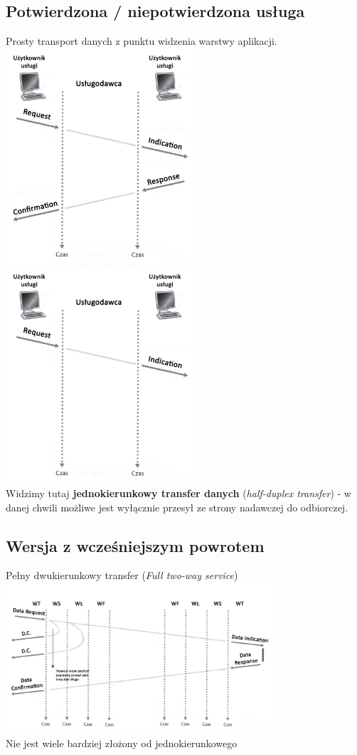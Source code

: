 \documentclass[a4paper,twoside]{article}
\begin{document}
\subsection{Potwierdzona / niepotwierdzona usługa}
Prosty transport danych z punktu widzenia warstwy aplikacji.\\
\includegraphics[width=7cm]{./images/image03_confirmation.jpg}
\includegraphics[width=7cm]{./images/image03_no_confirmation.jpg}\\
Widzimy tutaj \textbf{jednokierunkowy transfer danych} (\emph{half-duplex transfer}) - w danej chwili możliwe jest wyłącznie przesył ze strony nadawczej do odbiorczej.
\subsection{Wersja z wcześniejszym powrotem}
Pełny dwukierunkowy transfer (\emph{Full two-way service})\\
\includegraphics[width=10cm]{./images/image04.jpg}\\
Nie jest wiele bardziej złożony od jednokierunkowego
\end{document}

